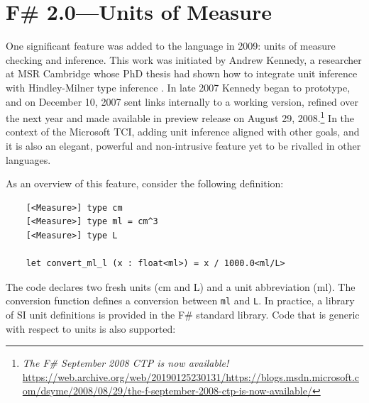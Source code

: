 \documentclass[acmsmall]{acmart}\settopmatter{}
\begin{document}
\section*{F\# 2.0---Units of Measure }

One significant feature was added to the language in 2009: units of measure checking and inference.  This
work was initiated by Andrew Kennedy, a researcher at MSR Cambridge whose PhD thesis had shown how to integrate
unit inference with Hindley-Milner type inference \citep{Kennedy1995}. In late 2007 Kennedy began to prototype, and on
December 10, 2007 sent links internally to a working version, refined over the next year and made available in preview
release on August 29, 2008.\footnote{\textit{The F\# September 2008 CTP is now available!} \url{https://web.archive.org/web/20190125230131/https://blogs.msdn.microsoft.com/dsyme/2008/08/29/the-f-september-2008-ctp-is-now-available/}}
In the context of the Microsoft TCI, adding unit inference aligned with other goals, and it
is also an elegant, powerful and non-intrusive feature yet to be rivalled in other languages.

As an overview of this feature, consider the following definition:

\begin{verbatim}
    [<Measure>] type cm
    [<Measure>] type ml = cm^3
    [<Measure>] type L

    let convert_ml_l (x : float<ml>) = x / 1000.0<ml/L>
\end{verbatim}

The code declares two fresh units (cm and L) and a unit abbreviation (ml).  The conversion function defines a conversion
between \texttt{ml} and \texttt{L}.  In practice, a library of SI unit definitions is provided in the F\# standard library.  Code
that is generic with respect to units is also supported:
\end{document}

